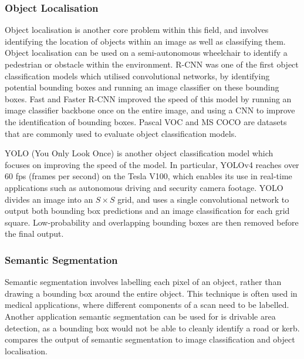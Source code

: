 \documentclass[12pt]{article}
\begin{document}
\subsubsection{Object Localisation}
Object localisation is another core problem within this field, and involves identifying the location of objects within an image as well as classifying them.
Object localisation can be used on a semi-autonomous wheelchair to identify
a pedestrian or obstacle within the environment. R-CNN \cite{girshickRichFeatureHierarchies2013} was one of the
first object classification models which utilised convolutional networks, by identifying potential bounding boxes
and running an image classifier on these bounding boxes. Fast and Faster R-CNN \cite{girshickFastRCNN2015}\cite{renFasterRCNNRealTime2015}
improved the speed of this model by running an image classifier backbone once on the entire image, and using a CNN to improve
the identification of bounding boxes. Pascal VOC \cite{everinghamPascalVisualObject2009} and MS COCO \cite{linMicrosoftCOCOCommon2014}
are datasets that are commonly used to evaluate object classification models.

YOLO (You Only Look Once) \cite{redmonYouOnlyLook2015}\cite{redmonYOLO9000BetterFaster2016}\cite{redmonYOLOv3IncrementalImprovement2018}\cite{bochkovskiyYOLOv4OptimalSpeed2020}
is another object classification model which focuses on improving the speed of the model. In particular, YOLOv4 \cite{bochkovskiyYOLOv4OptimalSpeed2020}
reaches over 60 fps (frames per second) on the Tesla V100, which enables its use in real-time applications such as autonomous driving and security camera footage. %
YOLO divides an image into an $S\times S$ grid, and uses a single convolutional network to output both bounding box predictions and
an image classification for each grid square. Low-probability and overlapping bounding boxes are then removed before the final output.

\subsubsection{Semantic Segmentation}
Semantic segmentation involves labelling each pixel of an object, rather than drawing a bounding box around the entire object.
This technique is often used in medical applications, where different components of a scan need to be labelled.
Another application semantic segmentation can be used for is drivable area detection, as a bounding box would not be able to cleanly
identify a road or kerb.  compares the output of semantic segmentation to image classification and object localisation.
\end{document}
